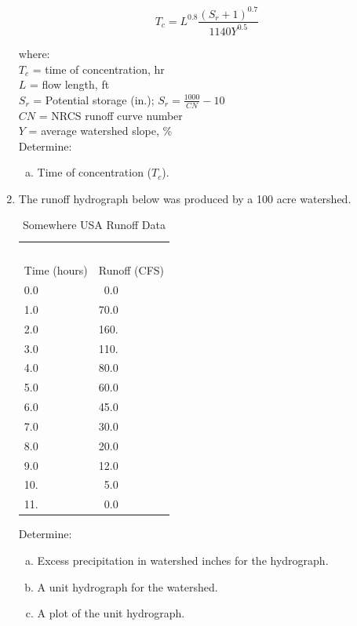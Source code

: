 \documentclass[12pt]{article}
\newcommand\mytab{\tabto{1cm}}
\begin{document}
\begin{enumerate}
\begin{equation}
T_c = L^{0.8} \frac{(S_r + 1)^{0.7}}{1140 Y^{0.5}}
\end{equation}


where: \\
\mytab $T_c$ = time of concentration, hr \\
\mytab $L$ = flow length, ft \\
\mytab $S_r$ = Potential storage (in.); $S_r = \frac{1000}{CN}-10$ \\
\mytab $CN$ = NRCS runoff curve number \\
\mytab $Y$ = average watershed slope, \% \\


Determine:
    \begin{enumerate}[a)]
        \item Time of concentration ($T_c$).
    \end{enumerate}

\clearpage

\item The runoff hydrograph below was produced by a 100 acre watershed.

\begin{table}[h!]
\centering
\caption{Somewhere USA Runoff Data}
\begin{tabular}{p{2.0in}p{2.0in}} %
~&~\\
Time (hours) & Runoff (CFS) \\
\hline
\hline
0.0 & ~0.0 \\
1.0 & 70.0 \\
2.0 & 160. \\
3.0 & 110. \\
4.0 & 80.0 \\
5.0 & 60.0 \\
6.0 & 45.0 \\
7.0 & 30.0 \\
8.0 & 20.0 \\
9.0 & 12.0 \\
10. & ~5.0 \\
11. & ~0.0 \\
\hline
\end{tabular}
\label{tab:SomewhereUSARain}
\end{table}

Determine:
    \begin{enumerate}[a)]
        \item Excess precipitation in watershed inches for the hydrograph.
        \item A unit hydrograph for the watershed.
        \item A plot of the unit hydrograph.
    \end{enumerate}


\end{enumerate}
\end{document}
